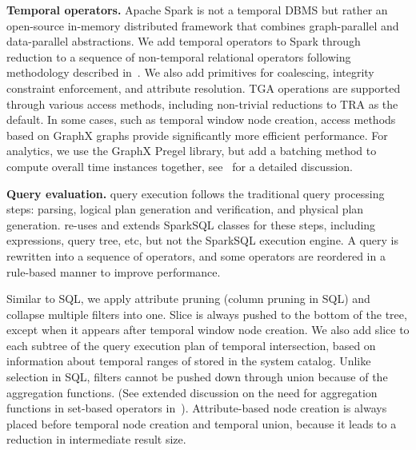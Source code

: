 {\bf Temporal operators.}  Apache Spark is not a temporal DBMS but
rather an open-source in-memory distributed framework that combines
graph-parallel and data-parallel abstractions.  We add temporal
operators to Spark through reduction to a sequence of non-temporal
relational operators following methodology described
in~\cite{Dignos2012}.  We also add primitives for coalescing,
integrity constraint enforcement, and attribute resolution.  TGA
operations are supported through various access methods, including
non-trivial reductions to TRA as the default.  In some cases, such as
temporal window node creation, access methods based on GraphX graphs
provide significantly more efficient performance.  For analytics, we
use the GraphX Pregel library, but add a batching method to compute
overall time instances together, see~\cite{MoffittTempWeb16} for a
detailed discussion.

{\bf Query evaluation.}  \sys query execution follows the traditional
query processing steps: parsing, logical plan generation and
verification, and physical plan generation. \sys re-uses and extends
SparkSQL classes for these steps, including expressions, query tree,
etc, but not the SparkSQL execution engine.  A \ql query is rewritten
into a sequence of \tga operators, and some operators are reordered in
a rule-based manner to improve performance.

Similar to SQL, we apply attribute pruning (column pruning in SQL) and
collapse multiple filters into one.  Slice is always pushed to the
bottom of the tree, except when it appears after temporal window node
creation.  We also add slice to each subtree of the query execution
plan of temporal intersection, based on information about temporal
ranges of \tgs stored in the system catalog.  Unlike selection in SQL, filters
cannot be pushed down through union because of the aggregation
functions.  (See extended discussion on the need for aggregation
functions in set-based operators in~\cite{PortalarXiv2016}).
Attribute-based node creation is always placed before temporal node
creation and temporal union, because it leads to a reduction in
intermediate result size.

